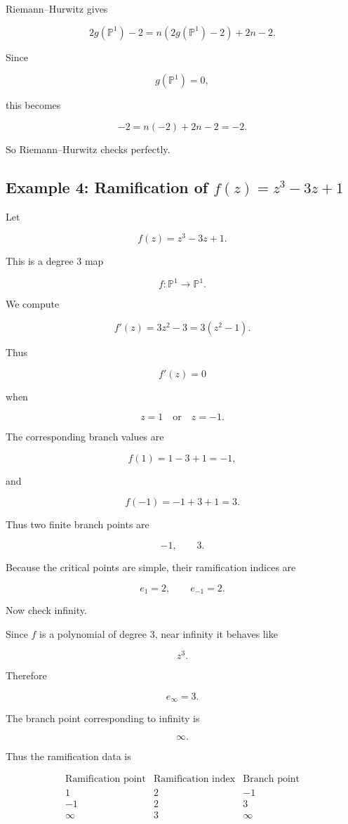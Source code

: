 \documentclass[12pt,a4paper]{article}
\theoremstyle{notespace}
\begin{document}
Riemann--Hurwitz gives

\[
2g(\mathbb P^1)-2
=
n(2g(\mathbb P^1)-2)
+
2n-2.
\]

Since

\[
g(\mathbb P^1)=0,
\]

this becomes

\[
-2
=
n(-2)+2n-2
=
-2.
\]

So Riemann--Hurwitz checks perfectly.

\subsection{Example 4: Ramification of \(f(z)=z^3-3z+1\)}

Let

\[
f(z)=z^3-3z+1.
\]

This is a degree \(3\) map

\[
f:\mathbb P^1\to\mathbb P^1.
\]

We compute

\[
f'(z)=3z^2-3=3(z^2-1).
\]

Thus

\[
f'(z)=0
\]

when

\[
z=1
\quad\text{or}\quad
z=-1.
\]

The corresponding branch values are

\[
f(1)=1-3+1=-1,
\]

and

\[
f(-1)=-1+3+1=3.
\]

Thus two finite branch points are

\[
-1,\qquad 3.
\]

Because the critical points are simple, their ramification indices are

\[
e_1=2,
\qquad
e_{-1}=2.
\]

Now check infinity.

Since \(f\) is a polynomial of degree \(3\), near infinity it behaves like

\[
z^3.
\]

Therefore

\[
e_\infty=3.
\]

The branch point corresponding to infinity is

\[
\infty.
\]

Thus the ramification data is

\[
\begin{array}{c|c|c}
	\text{Ramification point} & \text{Ramification index} & \text{Branch point}\\
	\hline
	1 & 2 & -1\\
	-1 & 2 & 3\\
	\infty & 3 & \infty
\end{array}
\]
\end{document}
